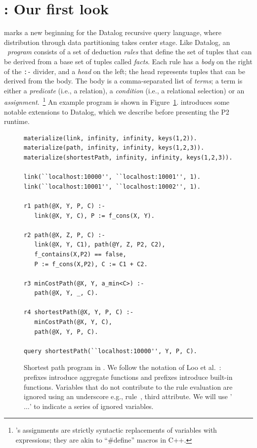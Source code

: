 \section{\OVERLOG: Our first look}
\label{ch:p2:sec:overlog}

\OVERLOG marks a new beginning for the Datalog recursive query language, where
distribution through data partitioning takes center stage.  Like Datalog, an
\OVERLOG~{\em program} consists of a set of deduction {\em rules} that define
the set of tuples that can be derived from a base set of tuples called {\em
facts}.  Each rule has a {\em body} on the right of the \texttt{:-} divider,
and a {\em head} on the left; the head represents tuples that can be derived
from the body.  The body is a comma-separated list of {\em terms}; a term is
either a {\em predicate} (i.e., a relation), a {\em condition} (i.e., a
relational selection) or an {\em assignment}.~\footnote{\OVERLOG's assignments
are strictly syntactic replacements of variables with expressions; they are
akin to ``\#define'' macros in C++.}  An example \OVERLOG program is shown in
Figure~\ref{ch:p2:fig:overlogSP}.  \OVERLOG introduces some notable extensions
to Datalog, which we describe before presenting the P2 runtime.

\begin{figure}
\ssp
\begin{lstlisting}
materialize(link, infinity, infinity, keys(1,2)).
materialize(path, infinity, infinity, keys(1,2,3)).
materialize(shortestPath, infinity, infinity, keys(1,2,3)).

link(``localhost:10000'', ``localhost:10001'', 1).
link(``localhost:10001'', ``localhost:10002'', 1).

r1 path(@X, Y, P, C) :-
   link(@X, Y, C), P := f_cons(X, Y).

r2 path(@X, Z, P, C) :-
   link(@X, Y, C1), path(@Y, Z, P2, C2),
   f_contains(X,P2) == false,
   P := f_cons(X,P2), C := C1 + C2.

r3 minCostPath(@X, Y, a_min<C>) :-
   path(@X, Y, _, C).

r4 shortestPath(@X, Y, P, C) :-
   minCostPath(@X, Y, C), 
   path(@X, Y, P, C).

query shortestPath(``localhost:10000'', Y, P, C).
\end{lstlisting}
\caption{\label{ch:p2:fig:overlogSP}Shortest path program in \OVERLOG. We
follow the notation of Loo et al.~\cite{boon-thesis}: 
prefixes introduce aggregate functions and  prefixes introduce
built-in functions. Variables that do not contribute to the rule evaluation
are ignored using an underscore e.g., rule~, third  attribute.
We will use '$\ldots$' to indicate a series of ignored variables. }
\end{figure}

